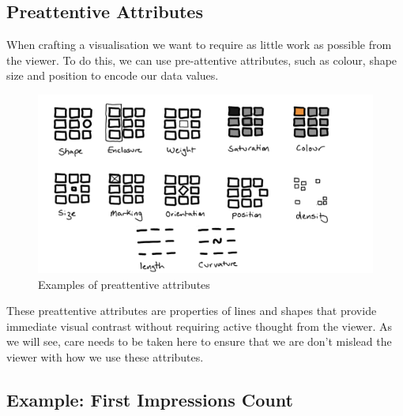 \documentclass[
  12pt,
]{book}
\begin{document}
\hypertarget{preattentive-attributes}{%
\subsection{Preattentive Attributes}\label{preattentive-attributes}}

When crafting a visualisation we want to require as little work as possible from the viewer.
To do this, we can use pre-attentive attributes, such as colour, shape size and position to encode our data values.

\begin{figure}
\includegraphics[width=1\linewidth]{images/303-data-visualisation/preattentive-attributes} \caption{Examples of preattentive attributes}\label{fig:unnamed-chunk-4}
\end{figure}

These preattentive attributes are properties of lines and shapes that provide immediate visual contrast without requiring active thought from the viewer. As we will see, care needs to be taken here to ensure that we are don't mislead the viewer with how we use these attributes.

\hypertarget{example-first-impressions-count}{%
\subsection{Example: First Impressions Count}\label{example-first-impressions-count}}
\end{document}
